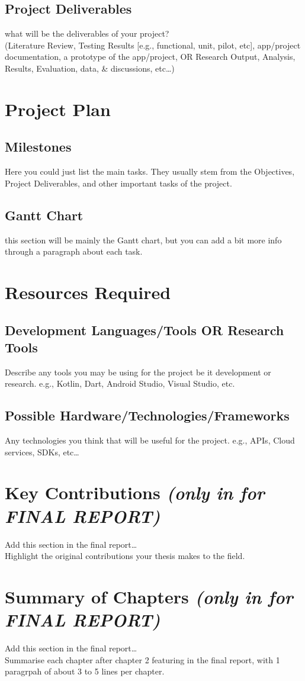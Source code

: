 \subsection{Project Deliverables}
what will be the deliverables of your project? \\
(Literature Review, Testing Results [e.g., functional, unit, pilot, etc], app/project documentation, a prototype of the app/project, OR Research Output, Analysis, Results, Evaluation, data, \& discussions, etc\ldots)

\section{Project Plan}
\subsection{Milestones}
Here you could just list the main tasks. They usually stem from the Objectives, Project Deliverables, and other important tasks of the project.
\subsection{Gantt Chart}
this section will be mainly the Gantt chart, but you can add a bit more info through a paragraph about each task.

\section{Resources Required}
\subsection{Development Languages/Tools OR Research Tools}
Describe any tools you may be using for the project be it development or research. e.g., Kotlin, Dart, Android Studio, Visual Studio, etc.
\subsection{Possible Hardware/Technologies/Frameworks}
Any technologies you think that will be useful for the project. e.g., APIs, Cloud services, SDKs, etc\ldots

\section{Key Contributions \textit{(only in for FINAL REPORT)}}
Add this section in the final report\ldots \\
Highlight the original contributions your thesis makes to the field.

\section{Summary of Chapters \textit{(only in for FINAL REPORT)}}
Add this section in the final report\ldots \\
Summarise each chapter after chapter 2 featuring in the final report, with 1 paragrpah of about 3 to 5 lines per chapter.